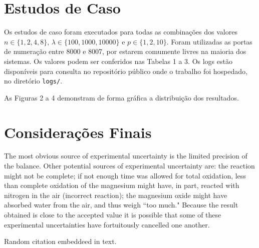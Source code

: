 \documentclass[a4paper,12pt]{article}
\begin{document}
        \section{Estudos de Caso}
        
        Os estudos de caso foram executados para todas as combinações dos valores $n \in \{1, 2, 4, 8\}$, $\lambda \in \{100, 1000, 10000\}$ e $p \in \{1, 2, 10\}$. Foram utilizadas as portas de numeração entre 8000 e 8007, por estarem comumente livres na maioria dos sistemas. Os valores podem ser conferidos nas Tabelas 1 a 3. Os logs estão disponíveis para consulta no repositório público onde o trabalho foi hospedado, no diretório \texttt{logs/}.

        



        As Figuras 2 a 4 demonstram de forma gráfica a distribuição dos resultados. 
        
        
        
        \section{Considerações Finais}
        
        
        The most obvious source of experimental uncertainty is the limited precision of the balance. Other potential sources of experimental uncertainty are: the reaction might not be complete; if not enough time was allowed for total oxidation, less than complete oxidation of the magnesium might have, in part, reacted with nitrogen in the air (incorrect reaction); the magnesium oxide might have absorbed water from the air, and thus weigh ``too much." Because the result obtained is close to the accepted value it is possible that some of these experimental uncertainties have fortuitously cancelled one another.

        Random citation \cite{WEBSITE:2} embeddeed in text.

        
        
        
        


    
\end{document}
